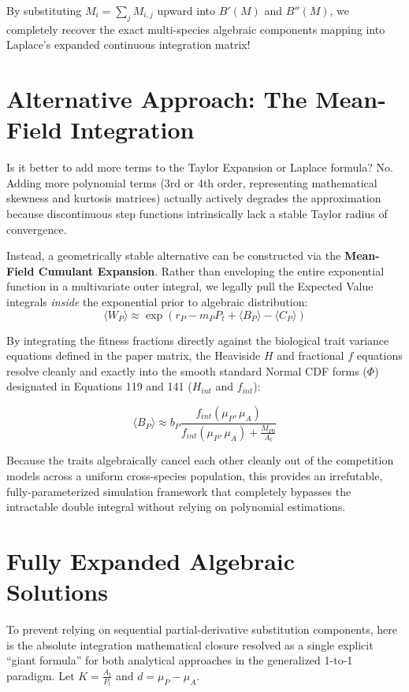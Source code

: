 \documentclass{article}
\begin{document}
By substituting $M_i = \sum_{j} M_{i,j}$ upward into $B'(M)$ and $B''(M)$, we completely recover the exact multi-species algebraic components mapping into Laplace's expanded continuous integration matrix!


\section{Alternative Approach: The Mean-Field Integration}
Is it better to add more terms to the Taylor Expansion or Laplace formula? No. Adding more polynomial terms (3rd or 4th order, representing mathematical skewness and kurtosis matrices) actually actively degrades the approximation because discontinuous step functions intrinsically lack a stable Taylor radius of convergence.

Instead, a geometrically stable alternative can be constructed via the \textbf{Mean-Field Cumulant Expansion}. Rather than enveloping the entire exponential function in a multivariate outer integral, we legally pull the Expected Value integrals \textit{inside} the exponential prior to algebraic distribution:
$$ \langle W_P \rangle \approx \exp\left( r_P - m_P P_t + \langle B_P \rangle - \langle C_P \rangle \right) $$

By integrating the fitness fractions directly against the biological trait variance equations defined in the paper matrix, the Heaviside $H$ and fractional $f$ equations resolve cleanly and exactly into the smooth standard Normal CDF forms ($\Phi$) designated in Equations 119 and 141 ($H_{int}$ and $f_{int}$):

$$ \langle B_P \rangle \approx b_P \frac{f_{int}(\mu_P, \mu_A)}{f_{int}(\mu_P, \mu_A) + \frac{M_{P0}}{A_t}} $$

Because the traits algebraically cancel each other cleanly out of the competition models across a uniform cross-species population, this provides an irrefutable, fully-parameterized simulation framework that completely bypasses the intractable double integral without relying on polynomial estimations.

\section{Fully Expanded Algebraic Solutions}
To prevent relying on sequential partial-derivative substitution components, here is the absolute integration mathematical closure resolved as a single explicit ``giant formula'' for both analytical approaches in the generalized 1-to-1 paradigm. Let $K = \frac{A_t}{P_t}$ and $d = \mu_P - \mu_A$.
\end{document}
